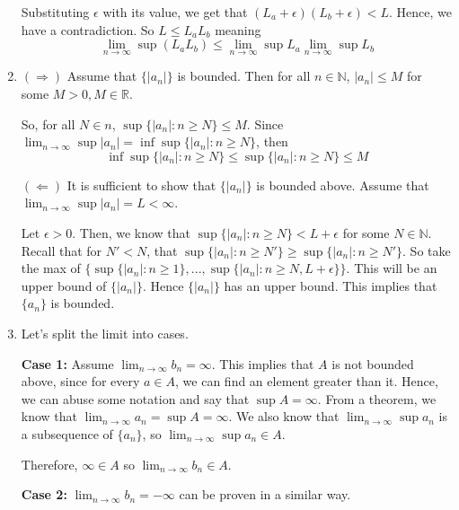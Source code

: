 \documentclass[12pt]{article}
\begin{document}
\begin{enumerate}[start=1,label={\bfseries Problem \arabic*:},leftmargin=1in]
    Substituting $\epsilon$ with its value, we get that $(L_{a} + \epsilon)(L_{b} + \epsilon) < L$. Hence, we have a contradiction. So $L \leq L_{a}L_{b}$ meaning 
    \[
        \lim_{n \to \infty} \sup (L_{a}L_{b}) \leq \lim_{n \to \infty} \sup L_{a} \lim_{n \to \infty} \sup L_{b}
    \]

    \item $(\Rightarrow)$ Assume that $\{ \left| a_{n} \right|  \}$ is bounded. 
    Then for all $n \in \mathbb{N}$, $|a_{n}| \leq M$ for some $M > 0, M \in \mathbb{R}$.

    So, for all $N \in n$, $\sup \{ \left|   a_{n} \right|: n \geq N \} \leq M$. Since $\lim_{ n \to \infty } \sup \left| a_{n} \right|  = \inf \sup \{ \left|   a_{n} \right| : n \geq N \}$, then 
    \[ 
        \inf \sup \{ \left|   a_{n} \right| : n \geq N \} \leq \sup \{ \left|  a_{n} \right|: n \geq N \} \leq M
    \]  

    $(\Leftarrow)$ It is sufficient to show that $\{ \left|  a_{n } \right|\}$ is bounded above. Assume that $\lim_{n \to \infty} \sup \left| a_{n} \right| = L < \infty$. 

    Let $\epsilon > 0$. Then, we know that $\sup \{\left| a_{n} \right| : n\geq N\} < L + \epsilon$ for some $N \in \mathbb{N}$. 
    Recall that for $N' < N$, that $\sup \{\left| a_{n} \right| : n\geq N'\} \geq \sup \{\left| a_{n} \right| : n\geq N'\}$. 
    So take the max of $\{\sup \{\left| a_{n} \right| : n\geq 1\} , ..., \sup \{\left| a_{n} \right| : n\geq N, L + \epsilon\}\}$. This will be an upper bound of $\{\left| a_{n} \right| \}$. Hence $\{ \left| a_{n} \right| \}$ has an upper bound. This implies that $\{a_{n}\}$ is bounded. 

    \item Let's split the limit into cases. 
    
    \textbf{Case 1:} Assume $\lim_{n \to \infty} b_{n} = \infty$. This implies that $A$ is not bounded above, since for every $a \in A$, we can find an element greater than it. 
    Hence, we can abuse some notation and say that $\sup A = \infty$. From a theorem, we know that $\lim_{n \to \infty} a_{n} = \sup A = \infty$. We also know that $\lim_{n \to \infty} \sup a_{n}$ is a subsequence of $\{ a_{n} \}$, so $\lim_{n \to \infty} \sup a_{n} \in A$. 
    
    Therefore, $\infty \in A$ so $\lim_{n \to \infty} b_{n} \in A$. 

    \textbf{Case 2:} $\lim_{n \to \infty} b_{n} = -\infty$ can be proven in a similar way. 


\end{enumerate}
\end{document}
